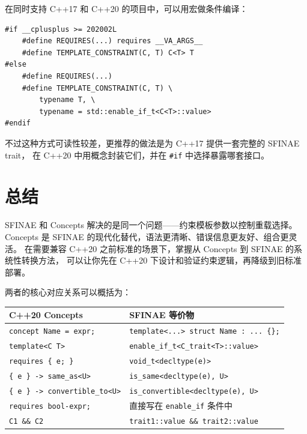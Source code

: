 \documentclass[12pt,a4paper,fontset=fandol]{ctexbook}
\begin{document}
在同时支持 C++17 和 C++20 的项目中，可以用宏做条件编译：

\begin{lstlisting}
#if __cplusplus >= 202002L
    #define REQUIRES(...) requires __VA_ARGS__
    #define TEMPLATE_CONSTRAINT(C, T) C<T> T
#else
    #define REQUIRES(...)
    #define TEMPLATE_CONSTRAINT(C, T) \
        typename T, \
        typename = std::enable_if_t<C<T>::value>
#endif
\end{lstlisting}

不过这种方式可读性较差，更推荐的做法是为 C++17 提供一套完整的 SFINAE trait，
在 C++20 中用概念封装它们，并在 \texttt{\#if} 中选择暴露哪套接口。

\section{总结}

SFINAE 和 Concepts 解决的是同一个问题——约束模板参数以控制重载选择。
Concepts 是 SFINAE 的现代化替代，语法更清晰、错误信息更友好、组合更灵活。
在需要兼容 C++20 之前标准的场景下，掌握从 Concepts 到 SFINAE 的系统性转换方法，
可以让你先在 C++20 下设计和验证约束逻辑，再降级到旧标准部署。

两者的核心对应关系可以概括为：

\begin{center}
\begin{tabular}{ll}
\toprule
\textbf{C++20 Concepts} & \textbf{SFINAE 等价物} \\
\midrule
\texttt{concept Name = expr;} & \texttt{template<...> struct Name : ... \{\};} \\
\texttt{template<C T>} & \texttt{enable\_if\_t<C\_trait<T>::value>} \\
\texttt{requires \{ e; \}} & \texttt{void\_t<decltype(e)>} \\
\texttt{\{ e \} -> same\_as<U>} & \texttt{is\_same<decltype(e), U>} \\
\texttt{\{ e \} -> convertible\_to<U>} & \texttt{is\_convertible<decltype(e), U>} \\
\texttt{requires bool-expr;} & 直接写在 \texttt{enable\_if} 条件中 \\
\texttt{C1 \&\& C2} & \texttt{trait1::value \&\& trait2::value} \\
\bottomrule
\end{tabular}
\end{center}
\end{document}
